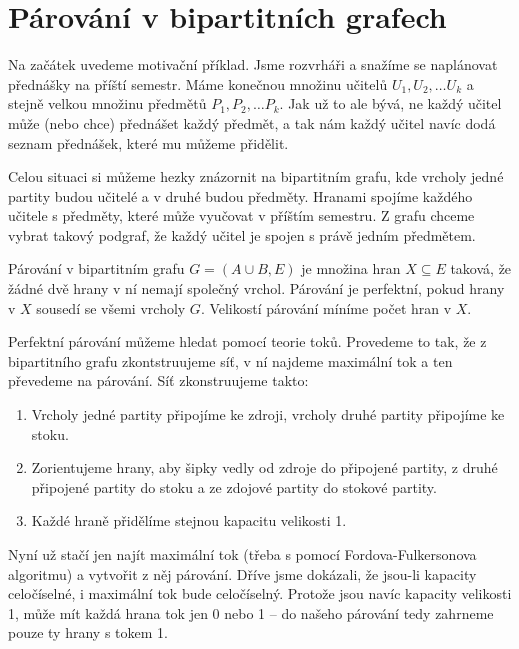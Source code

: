\section{Párování v bipartitních grafech}
\begin{t_example}
  Na začátek uvedeme motivační příklad. Jsme rozvrháři a snažíme se naplánovat přednášky na příští semestr. Máme konečnou množinu učitelů $U_1, U_2,\dots U_k$ a stejně velkou množinu předmětů $P_1, P_2,\dots P_k$. Jak už to ale bývá, ne každý učitel může (nebo chce) přednášet každý předmět, a tak nám každý učitel navíc dodá seznam přednášek, které mu můžeme přidělit.
  
  Celou situaci si můžeme hezky znázornit na bipartitním grafu, kde vrcholy jedné partity budou učitelé a v druhé budou předměty. Hranami spojíme každého učitele s předměty, které může vyučovat v příštím semestru. Z grafu chceme vybrat takový podgraf, že každý učitel je spojen s právě jedním předmětem.
\end{t_example}

\begin{t_definition}
  Párování v bipartitním grafu $G=(A\cup B,E)$ je množina hran $X\subseteq E$ taková, že žádné dvě hrany v ní nemají společný vrchol. Párování je perfektní, pokud hrany v $X$ sousedí se všemi vrcholy $G$. Velikostí párování míníme počet hran v $X$.
\end{t_definition}

Perfektní párování můžeme hledat pomocí teorie toků. Provedeme to tak, že z bipartitního grafu zkontstruujeme síť, v ní najdeme maximální tok a ten převedeme na párování. Síť zkonstruujeme takto:
\begin{enumerate}
  \item Vrcholy jedné partity připojíme ke zdroji, vrcholy druhé partity připojíme ke stoku.
  \item Zorientujeme hrany, aby šipky vedly od zdroje do připojené partity, z druhé připojené partity do stoku a ze zdojové partity do stokové partity.
  \item Každé hraně přidělíme stejnou kapacitu velikosti 1.
\end{enumerate}
Nyní už stačí jen najít maximální tok (třeba s pomocí Fordova-Fulkersonova algoritmu) a vytvořit z něj párování. Dříve jsme dokázali, že jsou-li kapacity celočíselné, i maximální tok bude celočíselný. Protože jsou navíc kapacity velikosti 1, může mít každá hrana tok jen 0 nebo 1 – do našeho párování tedy zahrneme pouze ty hrany s tokem 1.

